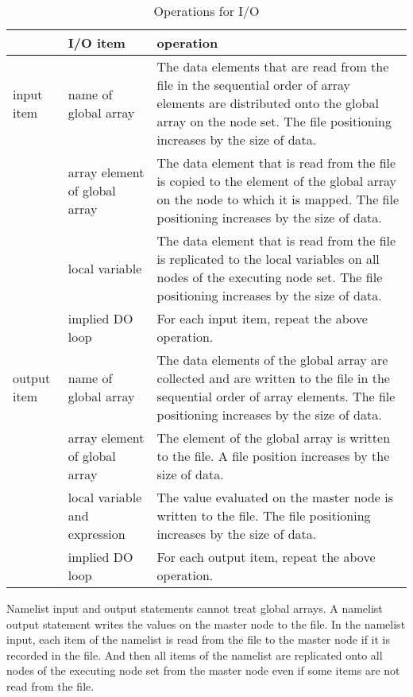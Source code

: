    \begin{table}[h]
    \begin{center}
    \caption{Operations for I/O}
    \label{tb:opforio}
     \begin{tabular}{|l|p{40mm}|p{80mm}|}
      \hline
      \multicolumn{1}{|c}{ }  & {\bf I/O item} & {\bf operation} \\
      \hline
      input item & name of global array & The data elements that are read 
	      from the file in the sequential order of array elements are distributed onto 
	      the global array on the node set. The file positioning increases by
	      the size of data. \\
      \cline{2-3}
      & array element of global array &  The data element that is read from the file
	      is copied to the element of the global array on the node to which it is mapped.
	      The file positioning increases by the size of data. \\
      \cline{2-3}
      & local variable & The data element that is read from the file is replicated to the
	      local variables on all nodes of the executing node
	      set. The file positioning increases by the size of data. \\
      \cline{2-3}
      & implied DO loop & For each input item, repeat the above operation. \\
      \hline
      output item & name of global array & The data elements of the
	      global array are collected and are written to the
	      file in the sequential order of array elements. The file
	      positioning increases by the size of data. \\
      \cline{2-3}
      & array element of global array &  The element of the global array is written to the file. A file position increases by the size of data. \\
      \cline{2-3}
      & local variable and expression & The value evaluated on the master node
	      is written to the file. The file positioning increases by
	      the size of data. \\
      \cline{2-3}
      & implied DO loop & For each output item, repeat the above operation. \\
      \hline
      \end{tabular}
     \end{center}
    \label{tb:aaa}
   \end{table}

   Namelist input and output statements cannot treat global arrays.
   A namelist output statement writes the values on the master node to
   the file.
   In the namelist input, each item of the namelist is read from the
   file to the master node if it is recorded in the file.
   And then all items of the namelist are replicated onto all nodes of
   the executing node set from the master node even if some items are not read from the file.

